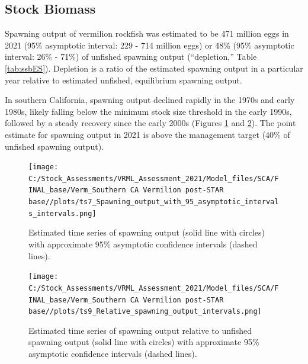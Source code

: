 \documentclass[11pt,
  english,
]{article}
\begin{document}
\FloatBarrier


\hypertarget{stock-biomass}{%
\subsection*{Stock Biomass}\label{stock-biomass}}

\leavevmode\tagmcend\tagstructend

Spawning output of vermilion rockfish was estimated to be 471 million eggs in 2021 (95\% asymptotic interval: 229 - 714 million eggs) or 48\% (95\% asymptotic interval: 26\% - 71\%) of unfished spawning output (``depletion,'' Table \ref{tab:ssbES}). Depletion is a ratio of the estimated spawning output in a particular year relative to estimated unfished, equilibrium spawning output.

In southern California, spawning output declined rapidly in the 1970s and early 1980s, likely falling below the minimum stock size threshold in the early 1990s, followed by a steady recovery since the early 2000s (Figures \ref{fig:ssbES} and \ref{fig:deplES}). The point estimate for spawning output in 2021 is above the management target (40\% of unfished spawning output).

\begin{figure}
\centering
\texttt{[image: C:/Stock\_Assessments/VRML\_Assessment\_2021/Model\_files/SCA/FINAL\_base/Verm\_Southern CA Vermilion post-STAR base//plots/ts7\_Spawning\_output\_with\_95\_asymptotic\_intervals\_intervals.png]}
\caption{Estimated time series of spawning output (solid line with circles) with approximate 95\% asymptotic confidence intervals (dashed lines).\label{fig:ssbES}}
\end{figure}

\begin{figure}
\centering
\texttt{[image: C:/Stock\_Assessments/VRML\_Assessment\_2021/Model\_files/SCA/FINAL\_base/Verm\_Southern CA Vermilion post-STAR base//plots/ts9\_Relative\_spawning\_output\_intervals.png]}
\caption{Estimated time series of spawning output relative to unfished spawning output (solid line with circles) with approximate 95\% asymptotic confidence intervals (dashed lines).\label{fig:deplES}}
\end{figure}
\end{document}
